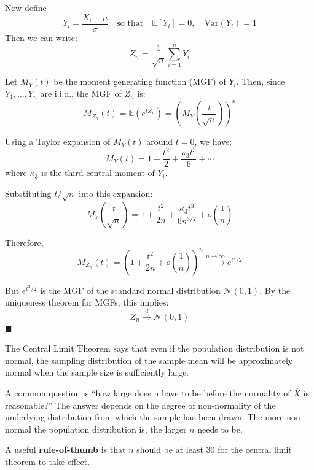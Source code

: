 \documentclass[twoside]{book}
\begin{document}
Now define
\[
Y_i = \frac{X_i - \mu}{\sigma}
\quad \text{so that} \quad \mathbb{E}[Y_i] = 0, \quad \text{Var}(Y_i) = 1
\]
Then we can write:
\[
Z_n = \frac{1}{\sqrt{n}} \sum_{i=1}^n Y_i
\]

Let $M_Y(t)$ be the moment generating function (MGF) of $Y_i$. Then, since $Y_1, \dots, Y_n$ are i.i.d., the MGF of $Z_n$ is:
\[
M_{Z_n}(t) = \mathbb{E}\left( e^{t Z_n}\right)  = \left( M_Y\left( \frac{t}{\sqrt{n}} \right) \right)^n
\]

Using a Taylor expansion of $M_Y(t)$ around $t = 0$, we have:
\[
M_Y(t) = 1 + \frac{t^2}{2} + \frac{\kappa_3 t^3}{6} + \cdots
\]
where $\kappa_3$ is the third central moment of $Y_i$.

Substituting $t / \sqrt{n}$ into this expansion:
\[
M_Y\left( \frac{t}{\sqrt{n}} \right)
= 1 + \frac{t^2}{2n} + \frac{\kappa_3 t^3}{6 n^{3/2}} + o\left( \frac{1}{n} \right)
\]

Therefore,
\[
M_{Z_n}(t) = \left( 1 + \frac{t^2}{2n} + o\left( \frac{1}{n} \right) \right)^n
\xrightarrow{n \to \infty} e^{t^2 / 2}
\]

But $e^{t^2/2}$ is the MGF of the standard normal distribution $\mathcal{N}(0,1)$. By the uniqueness theorem for MGFs, this implies:
\[
Z_n \xrightarrow{d} \mathcal{N}(0,1)
\]
\hfill$\blacksquare$

The Central Limit Theorem says that even if the population distribution is not normal, the sampling distribution of the sample mean will be approximately normal when the sample size is sufficiently large.

A common question is ``how large does n have to be before the normality of $\overline{X}$ is reasonable?'' The answer
depends on the degree of non-normality of the underlying distribution from which the sample has been drawn.
The more non-normal the population distribution is, the larger $n$ needs to be.
\begin{textbox}
A useful \textbf{rule-of-thumb} is that $n$ should be at least 30 for the central limit theorem to take effect.
\end{textbox}

\end{document}
